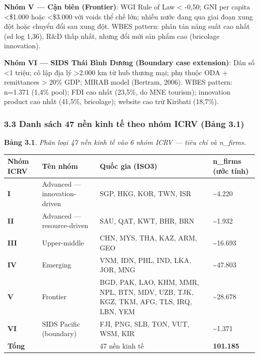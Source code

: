 \documentclass[12pt,a4paper]{article}
\begin{document}
\textbf{Nhóm V --- Cận biên (Frontier)}: WGI Rule of Law \textless{}
-0,50; GNI per capita \textless\$1.000 hoặc \textless\$3.000 với voids
thể chế lớn; nhiều nước đang qua giai đoạn xung đột hoặc chuyển đổi sau
xung đột. WBES pattern: phân tán năng suất cao nhất (sd log 1,36), R\&D
thấp nhất, nhưng đổi mới sản phẩm cao (bricolage innovation).

\textbf{Nhóm VI --- SIDS Thái Bình Dương (Boundary case extension)}: Dân
số \textless1 triệu; cô lập địa lý \textgreater2.000 km từ hub thương
mại; phụ thuộc ODA + remittances \textgreater{} 20\% GDP; MIRAB model
(Bertram, 2006). WBES pattern: n=1.371 (1,4\% pool); FDI cao nhất
(23,5\%, do MNE tourism); innovation product cao nhất (41,5\%,
bricolage); website cao trừ Kiribati (18,7\%).

\hypertarget{33-danh-suxe1ch-47-nux1ec1n-kinh-tux1ebf-theo-nhuxf3m-icrv-bux1ea3ng-31}{%
\subsubsection{3.3 Danh sách 47 nền kinh tế theo nhóm ICRV (Bảng
3.1)}\label{33-danh-suxe1ch-47-nux1ec1n-kinh-tux1ebf-theo-nhuxf3m-icrv-bux1ea3ng-31}}

\textbf{Bảng 3.1}. \emph{Phân loại 47 nền kinh tế vào 6 nhóm ICRV ---
tiêu chí và n\_firms.}

\begin{longtable}[]{@{}llll@{}}
\toprule\noalign{}
Nhóm ICRV & Tên nhóm & Quốc gia (ISO3) & n\_firms (ước tính) \\
\midrule\noalign{}
\endhead
\bottomrule\noalign{}
\endlastfoot
\textbf{I} & Advanced --- innovation-driven & SGP, HKG, KOR, TWN, ISR &
\textasciitilde4.220 \\
\textbf{II} & Advanced --- resource-driven & SAU, QAT, KWT, BHR, BRN &
\textasciitilde1.932 \\
\textbf{III} & Upper-middle & CHN, MYS, THA, KAZ, ARM, GEO &
\textasciitilde16.693 \\
\textbf{IV} & Emerging & VNM, IDN, PHL, IND, LKA, JOR, MNG &
\textasciitilde47.803 \\
\textbf{V} & Frontier & BGD, PAK, LAO, KHM, MMR, NPL, BTN, MDV, UZB,
TJK, KGZ, TKM, AFG, TLS, IRQ, LBN, YEM & \textasciitilde28.678 \\
\textbf{VI} & SIDS Pacific (boundary) & FJI, PNG, SLB, TON, VUT, WSM,
KIR & \textasciitilde1.371 \\
\textbf{Tổng} & & 47 nền kinh tế & \textbf{101.185} \\
\end{longtable}
\end{document}
